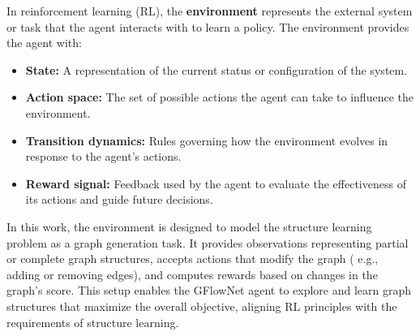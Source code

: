 \documentclass{lxaiproposal}
\begin{document}
    In reinforcement learning (RL), the \textbf{environment} represents the external system or task that the agent
    interacts with to learn a policy. The environment provides the agent with:
    \begin{itemize}
        \item \textbf{State:} A representation of the current status or configuration of the system.
        \item \textbf{Action space:} The set of possible actions the agent can take to influence the environment.
        \item \textbf{Transition dynamics:} Rules governing how the environment evolves in response to the agent's actions.
        \item \textbf{Reward signal:} Feedback used by the agent to evaluate the effectiveness of its actions and guide future decisions.
    \end{itemize}


    In this work, the environment is designed to model the structure learning problem as a graph generation task. It
    provides observations representing partial or complete graph structures, accepts actions that modify the graph (
    e.g., adding or removing edges), and computes rewards based on changes in the graph's score. This setup enables the
    GFlowNet agent to explore and learn graph structures that maximize the overall objective, aligning RL principles
    with the requirements of structure learning.


\end{document}
